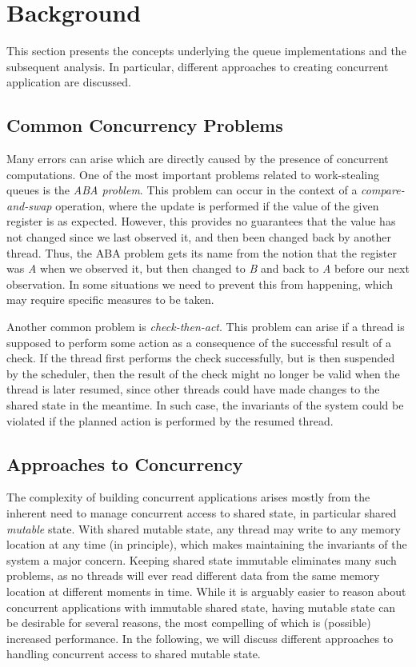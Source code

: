 \section{Background}
\label{sec:background}

This section presents the concepts underlying the queue implementations and the subsequent analysis. In particular, different approaches to creating concurrent application are discussed.

\subsection{Common Concurrency Problems}
Many errors can arise which are directly caused by the presence of concurrent computations. One of the most important problems related to work-stealing queues is the \emph{ABA problem}. This problem can occur in the context of a \emph{compare-and-swap} operation, where the update is performed if the value of the given register is as expected. However, this provides no guarantees that the value has not changed since we last observed it, and then been changed back by another thread. Thus, the ABA problem gets its name from the notion that the register was \emph{A} when we observed it, but then changed to \emph{B} and back to \emph{A} before our next observation. In some situations we need to prevent this from happening, which may require specific measures to be taken.

Another common problem is \emph{check-then-act}. This problem can arise if a thread is supposed to perform some action as a consequence of the successful result of a check. If the thread first performs the check successfully, but is then suspended by the scheduler, then the result of the check might no longer be valid when the thread is later resumed, since other threads could have made changes to the shared state in the meantime. In such case, the invariants of the system could be violated if the planned action is performed by the resumed thread.

\subsection{Approaches to Concurrency}
The complexity of building concurrent applications arises mostly from the inherent need to manage concurrent access to shared state, in particular shared \emph{mutable} state. With shared mutable state, any thread may write to any memory location at any time (in principle), which makes maintaining the invariants of the system a major concern. Keeping shared state immutable eliminates many such problems, as no threads will ever read different data from the same memory location at different moments in time. While it is arguably easier to reason about concurrent applications with immutable shared state, having mutable state can be desirable for several reasons, the most compelling of which is (possible) increased performance. In the following, we will discuss different approaches to handling concurrent access to shared mutable state.

